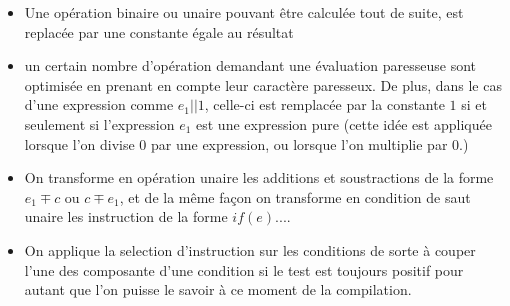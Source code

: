 \begin{itemize}
\item Une op\'eration binaire ou unaire pouvant \^etre calcul\'ee tout de suite, est replac\'ee par une constante \'egale au r\'esultat

\item un certain nombre d'op\'eration demandant une \'evaluation paresseuse sont optimis\'ee en prenant en compte leur caract\`ere paresseux. De plus, dans le cas d'une expression comme $e_1 || 1$, celle-ci est remplac\'ee par la constante $1$ si et seulement si l'expression $e_1$ est une expression pure (cette id\'ee est appliqu\'ee lorsque l'on divise $0$ par une expression, ou lorsque l'on multiplie par $0$.)

\item On transforme en op\'eration unaire les additions et soustractions de la forme $e_1 \mp c$ ou $c \mp e_1$, et de la m\^eme fa\c con on transforme en condition de saut unaire les instruction de la forme $if(e)...$.

\item On applique la selection d'instruction sur les conditions de sorte \`a couper l'une des composante d'une condition si le test est toujours positif pour autant que l'on puisse le savoir \`a ce moment de la compilation.
\end{itemize}


